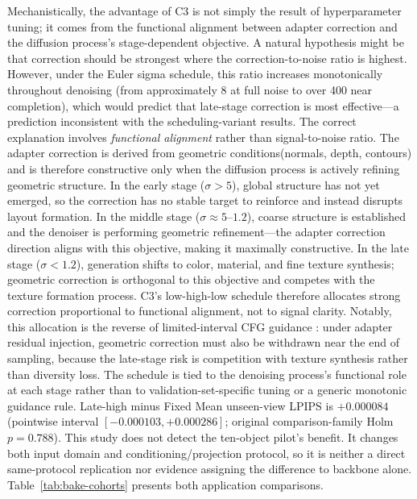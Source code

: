 \documentclass[times,twocolumn,final]{elsarticle}
\providecommand{\DIFadd}[1]{{\protect\color{blue} \sf #1}} %
\providecommand{\DIFdel}[1]{{\protect\color{red} \scriptsize #1}} %
\providecommand{\DIFaddbegin}{} %
\providecommand{\DIFaddend}{} %
\providecommand{\DIFdelbegin}{} %
\providecommand{\DIFdelend}{} %
\begin{document}
\DIFdelbegin \DIFdel{Mechanistically, the advantage of C3 is not simply the result of hyperparameter tuning; it comes from the functional alignment between adapter correction and the diffusion process's stage-dependent objective. A natural hypothesis might be that correction should be strongest where the correction-to-noise ratio is highest. However, under the Euler sigma schedule, this ratio increases monotonically throughout denoising (from approximately 8 at full noise to over 400 near completion), which would predict that late-stage correction is most effective---a prediction inconsistent with the scheduling-variant results. The correct explanation involves \emph{functional alignment} rather than signal-to-noise ratio.
The adapter correction is derived from geometric conditions(normals, depth, contours) and is therefore constructive only when the diffusion process is actively refining geometric structure. In the early stage ($\sigma > 5$), global structure has not yet emerged, so the correction has no stable target to reinforce and instead disrupts layout formation. In the middle stage ($\sigma \approx 5$--$1.2$), coarse structure is established and the denoiser is performing geometric refinement---the adapter correction direction aligns with this objective, making it maximally constructive. In the late stage ($\sigma < 1.2$), generation shifts to color, material, and fine texture synthesis; geometric correction is orthogonal to this objective and competes with the texture formation process. C3's low-high-low schedule therefore allocates strong correction proportional to functional alignment, not to signal clarity. Notably, this allocation is the reverse of limited-interval CFG guidance \cite{kynkanniemi2024limited}: under adapter residual injection, geometric correction must also be withdrawn near the end of sampling, because the late-stage risk is competition with texture synthesis rather than diversity loss. The schedule is tied to the denoising process's functional role at each stage rather than to validation-set-specific tuning or a generic monotonic guidance rule. }\DIFdelend \DIFaddbegin \DIFadd{Late-high minus Fixed Mean unseen-view LPIPS is $+0.000084$ (pointwise interval $[-0.000103,+0.000286]$; original comparison-family Holm $p=0.788$). This study does not detect the ten-object pilot's benefit. It changes both input domain and conditioning/projection protocol, so it is neither a direct same-protocol replication nor evidence assigning the difference to backbone alone. Table~\ref{tab:bake-cohorts} presents both application comparisons.
}\DIFaddend 
\end{document}
